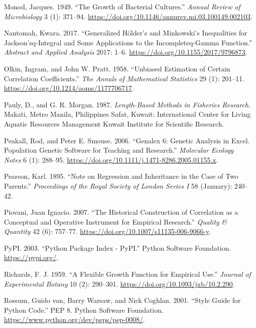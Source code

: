\documentclass[
  letterpaper,
  DIV=11,
  numbers=noendperiod]{scrreprt}
\newlength{\cslhangindent}
\newenvironment{CSLReferences}[2] %
 {\begin{list}{}{%
  \setlength{\itemindent}{0pt}
  \setlength{\leftmargin}{0pt}
  \setlength{\parsep}{0pt}
  \ifodd #1
   \setlength{\leftmargin}{\cslhangindent}
   \setlength{\itemindent}{-1\cslhangindent}
  \fi
  \setlength{\itemsep}{#2\baselineskip}}}
 {\end{list}}
\begin{document}
\begin{CSLReferences}{1}{0}
Monod, Jacques. 1949. {``{The} {Growth} {of} {Bacterial} {Cultures}.''}
\emph{Annual Review of Microbiology} 3 (1): 371--94.
\url{https://doi.org/10.1146/annurev.mi.03.100149.002103}.

Nantomah, Kwara. 2017. {``Generalized Hölder's and Minkowski's
Inequalities for Jackson'sq-Integral and Some Applications to the
Incompleteq-Gamma Function.''} \emph{Abstract and Applied Analysis}
2017: 1--6. \url{https://doi.org/10.1155/2017/9796873}.

Olkin, Ingram, and John W. Pratt. 1958. {``Unbiased Estimation of
Certain Correlation Coefficients.''} \emph{The Annals of Mathematical
Statistics} 29 (1): 201--11.
\url{https://doi.org/10.1214/aoms/1177706717}.

Pauly, D., and G. R. Morgan. 1987. \emph{Length-Based Methods in
Fisheries Research}. Makati, Metro Manila, Philippines Safat, Kuwait:
International Center for Living Aquatic Resources Management Kuwait
Institute for Scientific Research.

Peakall, Rod, and Peter E. Smouse. 2006. {``Genalex 6: Genetic Analysis
in Excel. Population Genetic Software for Teaching and Research.''}
\emph{Molecular Ecology Notes} 6 (1): 288--95.
\url{https://doi.org/10.1111/j.1471-8286.2005.01155.x}.

Pearson, Karl. 1895. {``Note on Regression and Inheritance in the Case
of Two Parents.''} \emph{Proceedings of the Royal Society of London
Series I} 58 (January): 240--42.

Piovani, Juan Ignacio. 2007. {``The Historical Construction of
Correlation as a Conceptual and Operative Instrument for Empirical
Research.''} \emph{Quality {\&} Quantity} 42 (6): 757--77.
\url{https://doi.org/10.1007/s11135-006-9066-y}.

PyPI. 2003. {``Python Package Index - PyPI.''} Python Software
Foundation. \url{https://pypi.org/}.

Richards, F. J. 1959. {``A Flexible Growth Function for Empirical
Use.''} \emph{Journal of Experimental Botany} 10 (2): 290--301.
\url{https://doi.org/10.1093/jxb/10.2.290}.

Rossum, Guido van, Barry Warsaw, and Nick Coghlan. 2001. {``Style Guide
for {Python} Code.''} PEP 8. Python Software Foundation.
\url{https://www.python.org/dev/peps/pep-0008/}.


\end{CSLReferences}
\end{document}

